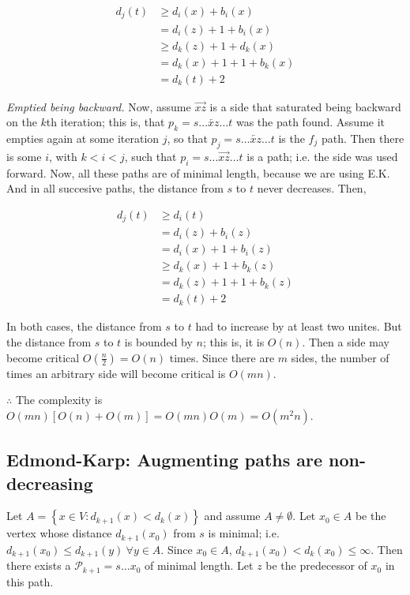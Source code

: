 \documentclass[a4paper]{article}
\begin{document}
\begin{align*}
    d_j(t) &\geq d_i(x) + b_i(x)  \\ 
           &=d_i(z) + 1 + b_i(x) \\ 
           &\geq d_k(z) + 1 + d_k(x) \\ 
           &=d_k(x) + 1 + 1 + b_k(x) \\ 
           &=d_k(t) + 2
\end{align*}

\textit{Emptied being backward.} Now, assume $\overrightarrow{xz}$ is a side
that saturated being backward on the $k$th iteration; this is, that $p_k = s
\ldots \overleftarrow{xz} \ldots t$ was the path found. Assume it empties again
at some iteration $j$, so that $p_j = s \ldots \overleftarrow{xz} \ldots t$ is
the $f_j$ path. Then there is some $i$, with $k < i < j$, such that $p_i = s
\ldots \overrightarrow{xz} \ldots t$ is a path; i.e. the side was used forward.
Now, all these paths are of minimal length, because we are using 
E.K. And in all succesive paths, the distance from $s$ to $t$ never 
decreases. Then,

\begin{align*}
    d_j(t) &\geq d_i(t) \\ 
           &= d_i(z) + b_i(z) \\ 
           &= d_i(x) + 1 + b_i(z) \\ 
           &\geq d_k(x) +1 + b_k(z) \\ 
           &=d_k(z) + 1 + 1 + b_k(z) \\ 
           &= d_k(t) + 2
\end{align*}

In both cases, the distance from $s$ to $t$ had to increase by at least 
two unites. But the distance from $s$ to $t$ is bounded by $n$; this is, 
it is $O(n)$. Then a side may become critical $O(\frac{n}{2}) = O(n)$ times.
Since there are $m$ sides, the number of times an arbitrary side will become 
critical is $O(mn)$.

$\therefore $ The complexity is $O(mn) \left[ O(n) + O(m) \right] = O(mn)O(m) = O(m^2n) $.


\pagebreak 

\subsection{Edmond-Karp: Augmenting paths are non-decreasing}

Let $A = \left\{ x \in V : d_{k+1}(x) < d_k(x) \right\} $ and
assume $A \neq \emptyset$. Let $x_0 \in A$ be the vertex whose distance
$d_{k+1}(x_0)$ from $s$ is minimal; i.e. $d_{k+1}(x_0) \leq d_{k+1}(y) ~
\forall y \in A$. Since $x_0 \in A$, $d_{k+1}(x_0) < d_k(x_0) \leq \infty$.
Then there exists a $\mathcal{P}_{k+1} = s \ldots x_0$ of minimal length.
Let $z$ be the predecessor of $x_0$ in this path.
\end{document}
